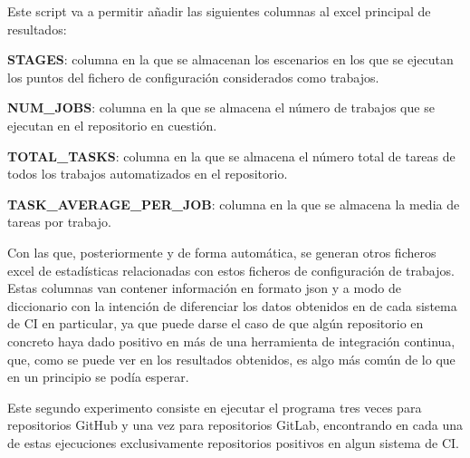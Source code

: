Este script va a permitir añadir las siguientes columnas al excel principal de resultados:
\begin{compactitem}
    \item \textbf{STAGES}: columna en la que se almacenan los escenarios en los que se ejecutan los puntos del fichero de configuración considerados como trabajos.
    \item \textbf{NUM\_JOBS}: columna en la que se almacena el número de trabajos que se ejecutan en el repositorio en cuestión.
    \item \textbf{TOTAL\_TASKS}: columna en la que se almacena el número total de tareas de todos los trabajos automatizados en el repositorio.
    \item \textbf{TASK\_AVERAGE\_PER\_JOB}: columna en la que se almacena la media de tareas por trabajo.
\end{compactitem}

Con las que, posteriormente y de forma automática, se generan otros ficheros excel de estadísticas relacionadas con estos ficheros de configuración de trabajos. Estas columnas van contener información en formato json y a modo de diccionario con la intención de diferenciar los datos obtenidos en de cada sistema de CI en particular, ya que puede darse el caso de que algún repositorio en concreto haya dado positivo en más de una herramienta de integración continua, que, como se puede ver en los resultados obtenidos, es algo más común de lo que en un principio se podía esperar.

Este segundo experimento consiste en ejecutar el programa tres veces para repositorios GitHub y una vez para repositorios GitLab, encontrando en cada una de estas ejecuciones exclusivamente repositorios positivos en algun sistema de CI. 

